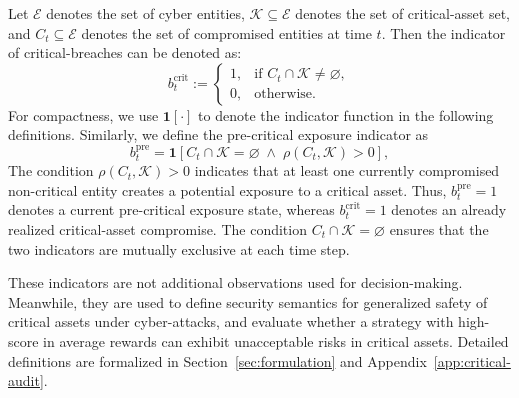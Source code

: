 \documentclass[sigconf,review,anonymous]{acmart}
\begin{document}
Let \(\mathcal{E}\) denotes the set of cyber entities, \(\mathcal{K}\subseteq\mathcal{E}\) denotes the set of critical-asset set, and \(C_t\subseteq\mathcal{E}\) denotes the set of compromised entities at time \(t\). Then the indicator of critical-breaches can be denoted as:
\begin{equation}
b_t^{\mathrm{crit}}
:=
\begin{cases}
1, & \text{if } C_t\cap\mathcal{K}\neq\varnothing,\\
0, & \text{otherwise}.
\end{cases}
\label{eq:threat-critical-breach}
\end{equation}
For compactness, we use \(\mathbf{1}[\cdot]\) to denote the indicator function in the following definitions. 
Similarly, we define the pre-critical exposure indicator as
\begin{equation}
b_t^{\mathrm{pre}}
=
\mathbf{1}\!\left[
C_t\cap\mathcal{K}=\varnothing
\;\land\;
\rho(C_t,\mathcal{K})>0
\right],
\label{eq:threat-precritical}
\end{equation}
The condition \(\rho(C_t,\mathcal K)>0\) indicates that at least one currently compromised non-critical entity creates a potential exposure to a critical asset. 
Thus, \(b_t^{\mathrm{pre}}=1\) denotes a current pre-critical exposure state, whereas \(b_t^{\mathrm{crit}}=1\) denotes an already realized critical-asset compromise. 
The condition \(C_t\cap\mathcal K=\varnothing\) ensures that the two indicators are mutually exclusive at each time step.

These indicators are not additional observations used for decision-making. 
Meanwhile, they are used to define security semantics for generalized safety of critical assets under cyber-attacks, and evaluate whether a strategy with high-score in average rewards can exhibit unacceptable risks in critical assets. Detailed definitions are formalized in Section~\ref{sec:formulation} and Appendix~\ref{app:critical-audit}.


\end{document}
